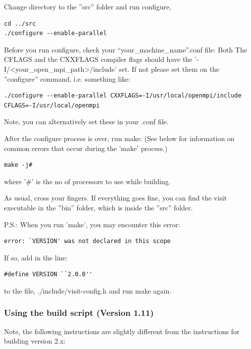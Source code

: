 \documentclass[12pt]{article}
\begin{document}
Change directory to the ''src'' folder and run configure,

\begin{verbatim}
cd ../src
./configure --enable-parallel
\end{verbatim}

Before you run configure, check your ``your_machine_name''.conf
file: Both The CFLAGS and the CXXFLAGS compiler flags should have the
'-I/<your_open_mpi_path>/include' set. If not please set them on the
''configure'' command, i.e. something like:

\begin{verbatim}
./configure --enable-parallel CXXFLAGS=-I/usr/local/openmpi/include CFLAGS=-I/usr/local/openmpi
\end{verbatim}

Note, you can alternatively set these in your .conf file.

After the configure process is over, run make:  (See below for
information on common errors that occur during the 'make' process.)

\begin{verbatim}
make -j#
\end{verbatim}

where '#' is the no of processors to use while building.

As usual, cross your fingers. If everything goes fine, you can find
the visit executable in the ''bin'' folder, which is inside the
''src'' folder.

P.S.: When you run 'make', you may encounter this error:

\begin{verbatim}
error: `VERSION' was not declared in this scope
\end{verbatim}

If so, add in the line:

\begin{verbatim}
#define VERSION ``2.0.0''
\end{verbatim}

to the file, ./include/visit-config.h and run make again.

\subsubsection{Using the build script (Version 1.11) }
\label{subsec:UsingTheBuildScript}

Note, the following instructions are slightly different from the instructions
for building version 2.x:
\end{document}
